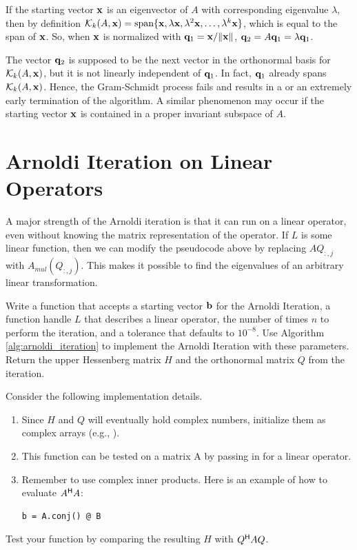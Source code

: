 \begin{warn}
If the starting vector $\mathbf{x}$ is an eigenvector of $A$ with corresponding eigenvalue $\lambda$, then by definition $\mathcal{K}_k(A, \mathbf{x})=\text{span}\{\mathbf{x}, \lambda \mathbf{x}, \lambda^2\mathbf{x}, \ldots, \lambda^k \mathbf{x}\}$, which is equal to the span of $\mathbf{x}$.
So, when $\mathbf{x}$ is normalized with $\mathbf{q}_1 = \mathbf{x}/\|\mathbf{x}\|$, $\mathbf{q}_2 = A\mathbf{q}_1 = \lambda \mathbf{q}_1$.

The vector $\mathbf{q}_2$ is supposed to be the next vector in the orthonormal basis for $\mathcal{K}_k(A, \mathbf{x})$, but it is not linearly independent of $\mathbf{q}_1$.
In fact, $\mathbf{q}_1$ already spans $\mathcal{K}_k(A, \mathbf{x})$.
Hence, the Gram-Schmidt process fails and results in a  or an extremely early termination of the algorithm.
A similar phenomenon may occur if the starting vector $\mathbf{x}$ is contained in a proper invariant subspace of $A$.
\end{warn}

\section*{Arnoldi Iteration on Linear Operators} %

A major strength of the Arnoldi iteration is that it can run on a linear operator, even without knowing the matrix representation of the operator.
If $L$ is some linear function, then we can modify the pseudocode above by replacing $AQ_{:,j}$ with $A_{mul}(Q_{:,j})$.
This makes it possible to find the eigenvalues of an arbitrary linear transformation.

\begin{problem}\label{prob:arnoldi}
Write a function that accepts a starting vector $\mathbf{b}$ for the Arnoldi Iteration, a function handle $L$ that describes a linear operator, the number of times $n$ to perform the iteration, and a tolerance  that defaults to $10^{-8}$.
Use Algorithm \ref{alg:arnoldi_iteration} to implement the Arnoldi Iteration with these parameters.
Return the upper Hessenberg matrix $H$ and the orthonormal matrix $Q$ from the iteration.

Consider the following implementation details.
\begin{enumerate}
\item Since $H$ and $Q$ will eventually hold complex numbers, initialize them as complex arrays (e.g., ).
\item This function can be tested on a matrix A by passing in  for a linear operator.
\item Remember to use complex inner products. Here is an example of how to evaluate $A^{\mathsf H} A$:
\begin{lstlisting}
b = A.conj() @ B
\end{lstlisting}
\end{enumerate}
Test your function by comparing the resulting $H$ with $Q^{\mathsf H} A Q$.
\end{problem}

